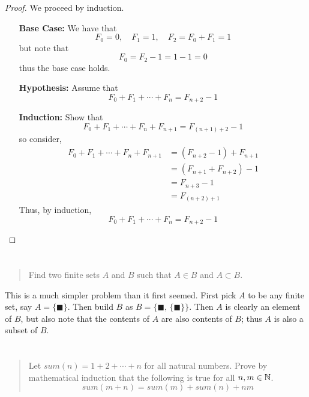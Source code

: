 \documentclass{article}
\begin{document}
\begin{proof}
    We proceed by induction.
    \begin{itemize}
        \item[\textbf{Base Case:}] We have that
              \[F_0 = 0,\quad F_1 = 1,\quad F_2 = F_0 + F_1 = 1\]
              but note that
              \[F_0 = F_2 - 1 = 1 - 1 = 0\]
              thus the base case holds.
        \item[\textbf{Hypothesis:}] Assume that
              \[F_0 + F_1 + \cdots + F_n = F_{n + 2} - 1\]
        \item[\textbf{Induction:}] Show that
              \[F_0 + F_1 + \cdots + F_n + F_{n + 1} = F_{(n + 1) + 2} - 1\]
              so consider,
              \begin{align*}
                  F_0 + F_1 + \cdots + F_n + F_{n + 1} & = (F_{n + 2} - 1) + F_{n + 1} \\
                                                       & = (F_{n + 1} + F_{n + 2}) - 1 \\
                                                       & = F_{n + 3} - 1               \\
                                                       & = F_{(n + 2) + 1}
              \end{align*}
              Thus, by induction,
              \[F_0 + F_1 + \cdots + F_n = F_{n + 2} - 1\]
    \end{itemize}
\end{proof}

\section{}
\begin{quote}
    Find two finite sets $A$ and $B$ such that $A \in B$ and $A \subset B$.
\end{quote}

This is a much simpler problem than it first seemed. First pick $A$ to be any finite set, say $A =
    \{\blacksquare \}$. Then build $B$ as $B = \big \{\blacksquare,\, \{\blacksquare \} \big \}$.
Then $A$ is clearly an element of $B$, but also note that the contents of $A$ are also
contents of $B$; thus $A$ is also a subset of $B$.

\section{}
\begin{quote}
    Let $sum(n) = 1 + 2 + \cdots + n$ for all natural numbers. Prove by
    mathematical induction that the following is true for all $n, m \in \mathbb{N}$.
    \[ sum(m + n) = sum(m) + sum(n) + nm \]
\end{quote}
\end{document}
